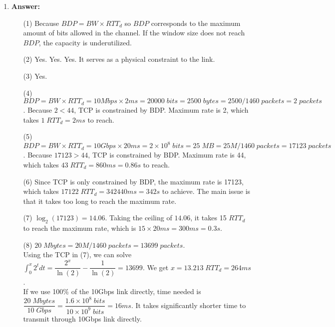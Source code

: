 \documentclass[12pt]{article}
\begin{document}
\begin{enumerate}
\item{} \textbf{Answer:}
\begin{itemize}
\item[(1)] Because $BDP = BW\times RTT_d$ so $BDP$ corresponds to the maximum amount of bits allowed in the channel. If the window size does not reach $BDP$, the capacity is underutilized.\\
\item[(2)] Yes. Yes. Yes. It serves as a physical constraint to the link.\\
\item[(3)] Yes.\\
\item[(4)] $BDP=BW\times RTT_d=10Mbps\times 2ms=20000\; bits=2500\; bytes = 2500/1460 \;packets = 2\;packets$. Because $2<44$, TCP is constrained by BDP. Maximum rate is 2, which takes $1\;RTT_d=2ms$ to reach.\\
\item[(5)] $BDP=BW\times RTT_d=10Gbps\times 20ms=2\times10^8\; bits=25\; MB = 25M/1460 \;packets = 17123\;packets$. Because $17123>44$, TCP is constrained by BDP. Maximum rate is 44, which takes $43\;RTT_d=860ms=0.86s$ to reach.\\
\item[(6)] Since TCP is only constrained by BDP, the maximum rate is 17123, which takes $17122\;RTT_d=342440ms=342s$ to achieve. The main issue is that it takes too long to reach the maximum rate.\\
\item[(7)] $\log_2(17123)=14.06$. Taking the ceiling of $14.06$, it takes 15 $RTT_d$ to reach the maximum rate, which is $15\times 20ms=300ms=0.3s$.\\
\item[(8)] $20\;Mbytes=20M/1460\;packets=13699\;packets$.\\
Using the TCP in (7), we can solve $\int_{0}^{x}2^tdt=\dfrac{2^x}{\ln(2)}-\dfrac{1}{\ln(2)}=13699$. We get $x=13.213\;RTT_d=264ms$.\\
If we use 100\% of the 10Gbps link directly, time needed is $\dfrac{20\;Mbytes}{10\;Gbps}=\dfrac{1.6\times10^8\;bits}{10\times10^9\;bits}=16ms$. It takes significantly shorter time to transmit through 10Gbps link directly.

\end{itemize}


















\end{enumerate}
\end{document}
